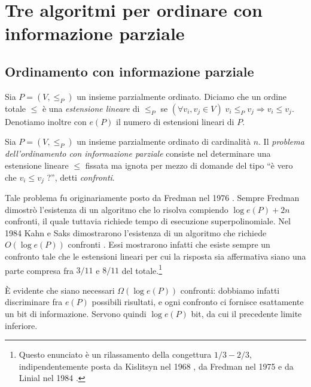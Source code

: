 \chapter{Tre algoritmi per ordinare con informazione parziale}

\section{Ordinamento con informazione parziale} 
\begin{definition}
  Sia \(P=\left(V,\le_{P}\right)\) un insieme parzialmente ordinato. Diciamo che un ordine totale \(\le\) \`e una \emph{estensione lineare} di \(\le_{P}\) se \((\forall v_i, v_j\in V)\;v_i\le_{P} v_j\Rightarrow v_i\le v_j\). Denotiamo inoltre con \(e(P)\) il numero di estensioni lineari di \(P\). 
\end{definition}
\begin{definition}
  Sia \(P=(V,\le_{P})\) un insieme parzialmente ordinato di cardinalit\`a \(n\). Il \emph{problema dell'ordinamento con informazione parziale} consiste nel determinare una estensione lineare \(\le\) fissata ma ignota per mezzo di domande del tipo ``\`e vero che \(v_i\le v_j\) ?'', detti \emph{confronti}. 
\end{definition}

Tale problema fu originariamente posto da Fredman nel 1976 \cite{Fredman1976}. Sempre Fredman dimostrò l'esistenza di un algoritmo che lo risolva compiendo \(\log{e(P)} + 2n\) confronti, il quale tuttavia richiede tempo di esecuzione superpolinomiale. Nel 1984 Kahn e Saks dimostrarono l'esistenza di un algoritmo che richiede \(O(\log{e(P)})\) confronti \cite{Kahn1984}. Essi mostrarono infatti che esiste sempre un confronto tale che le estensioni lineari per cui la risposta sia affermativa siano una parte compresa fra \(3/11\) e \(8/11\) del totale.\footnote{Questo enunciato è un rilassamento della congettura \(1/3-2/3\), indipendentemente posta da Kislitsyn nel 1968 \cite{Kislitsyn1968}, da Fredman nel 1975 e da Linial nel 1984 \cite{Linial1984}.}

È evidente che siano necessari \(\Omega(\log{e(P)})\) confronti: dobbiamo infatti discriminare fra \(e(P)\) possibili risultati, e ogni confronto ci fornisce esattamente un bit di informazione. Servono quindi \(\log{e(P)}\) bit, da cui il precedente limite inferiore.

